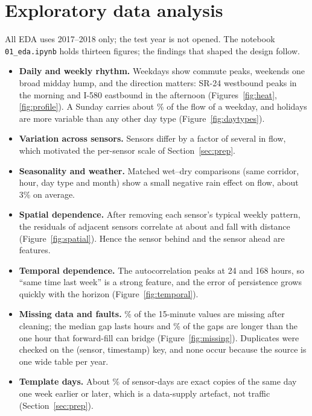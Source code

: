 \documentclass[11pt,a4paper]{article}
\newcommand{\code}[1]{\texttt{#1}}
\begin{document}
\section{Exploratory data analysis}
All EDA uses 2017--2018 only; the test year is not opened. The notebook \code{01\_eda.ipynb} holds thirteen figures; the findings that shaped the design follow.

\begin{itemize}
\item \textbf{Daily and weekly rhythm.} Weekdays show commute peaks, weekends one broad midday hump, and the direction matters: SR-24 westbound peaks in the morning and I-580 eastbound
in the afternoon (Figures~\ref{fig:heat}, \ref{fig:profile}). A Sunday carries about \weekendRatio\% of the flow of a weekday, and holidays are more variable than any other day type
(Figure~\ref{fig:daytypes}).
\item \textbf{Variation across sensors.} Sensors differ by a factor of several in flow, which motivated the per-sensor scale of Section~\ref{sec:prep}.
\item \textbf{Seasonality and weather.} Matched wet--dry comparisons (same corridor, hour, day type and month) show a small negative rain effect on flow, about 3\% on average.
\item \textbf{Spatial dependence.} After removing each sensor's typical weekly pattern, the residuals of adjacent sensors correlate at about \nbCorr{} and fall with distance
(Figure~\ref{fig:spatial}). Hence the sensor behind and the sensor ahead are features.
\item \textbf{Temporal dependence.} The autocorrelation peaks at 24 and 168 hours, so ``same time last week'' is a strong feature, and the error of persistence grows quickly with the
horizon (Figure~\ref{fig:temporal}).
\item \textbf{Missing data and faults.} \missingPct\% of the 15-minute values are missing after cleaning; the median gap lasts \gapMedian{} hours and \gapLong\% of the gaps are longer than the
one hour that forward-fill can bridge (Figure~\ref{fig:missing}). Duplicates were checked on the (sensor, timestamp) key, and none occur because the source is one wide table per year.
\item \textbf{Template days.} About \templateShare\% of sensor-days are exact copies of the same day one week earlier or later, which is a data-supply artefact, not traffic
(Section~\ref{sec:prep}).
\end{itemize}
\end{document}
